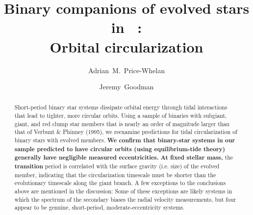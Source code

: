 \documentclass[modern, letterpaper]{aastex62}
\newcommand{\apogee}{\project{\acronym{APOGEE}}}
\newcommand{\DR}{\acronym{DR14}}
\renewcommand{\changes}[1]{\textbf{#1}}
\begin{document}
\sloppy\sloppypar\raggedbottom\frenchspacing %

\title{Binary companions of evolved stars in \apogee\ \DR: \\
       Orbital circularization}

\author[0000-0003-0872-7098]{Adrian~M.~Price-Whelan}

\author[0000-0002-6710-7748]{Jeremy~Goodman}



\begin{abstract}\noindent %
Short-period binary star systems dissipate orbital energy through tidal interactions that lead to tighter, more circular orbits.
Using a sample of binaries with subgiant, giant, and red clump star members that is nearly an order of magnitude larger than that of Verbunt \& Phinney (1995), we reexamine predictions for tidal circularization of binary stars with evolved members.
\changes{We confirm that binary-star systems in our sample predicted to have
circular orbits (using equilibrium-tide theory) generally have negligible
measured eccentricities.}
\changes{At fixed stellar mass,} the \changes{transition} period is correlated
with the surface gravity (i.e. size) of the evolved member, indicating that the
circularization timescale must be shorter than the evolutionary timescale along
the giant branch.
A few exceptions to the conclusions above are mentioned in the discussion: Some
of these exceptions are likely systems in which the spectrum of the secondary
biases the radial velocity measurements, but four appear to be genuine,
short-period, moderate-eccentricity systems.

\end{abstract}
\end{document}
